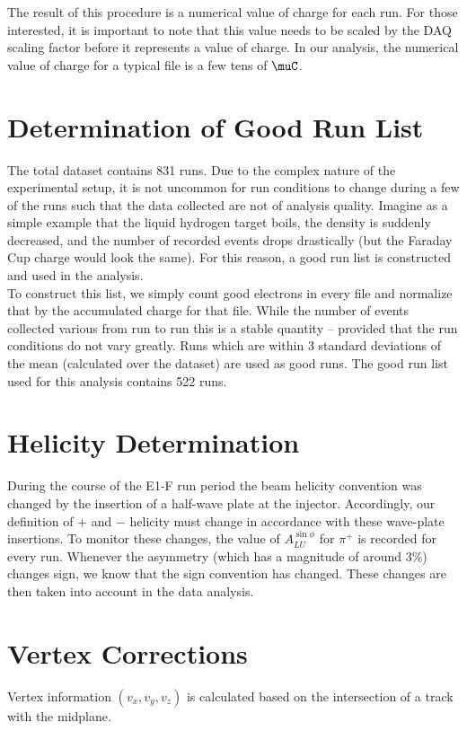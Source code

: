 The result of this procedure is a numerical value of charge for each run.  For those interested, it is important to note that this value needs to be scaled by the DAQ scaling factor before it represents a value of charge.  In our analysis, the numerical value of charge for a typical file is a few tens of $\muC$.

\section{Determination of Good Run List}
The total dataset contains 831 runs.  Due to the complex nature of the experimental setup, it is not uncommon for run conditions to change during a few of the runs such that the data collected are not of analysis quality.  Imagine as a simple example that the liquid hydrogen target boils, the density is suddenly decreased, and the number of recorded events drops drastically (but the Faraday Cup charge would look the same).  For this reason, a good run list is constructed and used in the analysis. \\

To construct this list, we simply count good electrons in every file and normalize that by the accumulated charge for that file.  While the number of events collected various from run to run this is a stable quantity -- provided that the run conditions do not vary greatly.  Runs which are within 3 standard deviations of the mean (calculated over the dataset) are used as good runs.  The good run list used for this analysis contains 522 runs.  

\section{Helicity Determination}
During the course of the E1-F run period the beam helicity convention was changed by the insertion of a half-wave plate at the injector.  Accordingly, our definition of $+$ and $-$ helicity must change in accordance with these wave-plate insertions.  To monitor these changes, the value of $A_{LU}^{\sin\phi}$ for $\pi^+$ is recorded for every run.  Whenever the asymmetry (which has a magnitude of around $3\%$) changes sign, we know that the sign convention has changed.  These changes are then taken into account in the data analysis.   

\section{Vertex Corrections}
Vertex information $(v_x, v_y, v_z)$ is calculated based on the intersection of a track with the midplane.  

